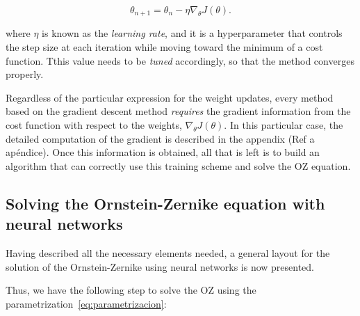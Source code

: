 \begin{equation}
    \theta_{n+1} = \theta_n - \eta \nabla_{\theta} J(\theta) .
    \label{eq:gradiente}
\end{equation}

where $\eta$ is known as the \emph{learning rate}, and it is a hyperparameter
that controls the step size at each iteration while moving toward the minimum
of a cost function. Tthis value needs to be \emph{tuned} accordingly, so
that the method converges properly.

Regardless of the particular expression for the weight updates, every method
based on the gradient descent method \emph{requires} the gradient information from
the cost function with respect to the weights, $\nabla_{\theta} J(\theta)$.
In this particular case, the detailed computation of the gradient is described in
the appendix (Ref a apéndice).
Once this information is obtained, all that is left is to build an algorithm that
can correctly use this training scheme and solve the OZ equation.

\subsection{Solving the Ornstein-Zernike equation with neural networks}
Having described all the necessary elements needed, a general layout for the solution
of the Ornstein-Zernike using neural networks is now presented.

Thus, we have the following step to solve the OZ using the parametrization~\eqref{eq:parametrizacion}:

